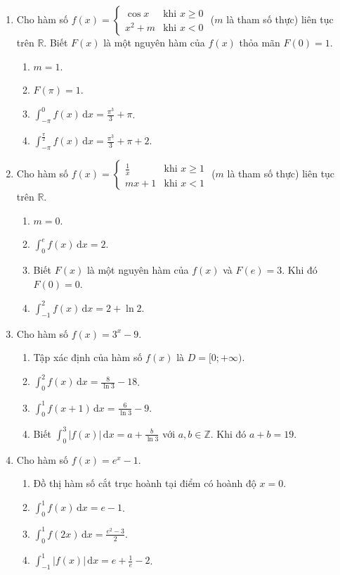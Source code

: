 \documentclass[12pt]{article}
\begin{document}
\begin{enumerate}[label=\textbf{Câu \arabic*.}]
		\item Cho hàm số $f(x) = \begin{cases} \cos x & \text{khi } x \ge 0 \\ x^2 + m & \text{khi } x < 0 \end{cases}$ ($m$ là tham số thực) liên tục trên $\mathbb{R}$. Biết $F(x)$ là một nguyên hàm của $f(x)$ thỏa mãn $F(0) = 1$.
		\begin{enumerate}[label=\alph*)]
			\item $m = 1$.
			\item $F(\pi) = 1$.
			\item $\displaystyle \int_{-\pi}^0 f(x)\,\mathrm{d}x = \frac{\pi^3}{3} + \pi$.
			\item $\displaystyle \int_{-\pi}^{\frac{\pi}{2}} f(x)\,\mathrm{d}x = \frac{\pi^3}{3} + \pi + 2$.
		\end{enumerate}
		
		\item Cho hàm số $f(x) = \begin{cases} \frac{1}{x} & \text{khi } x \ge 1 \\ mx + 1 & \text{khi } x < 1 \end{cases}$ ($m$ là tham số thực) liên tục trên $\mathbb{R}$.
		\begin{enumerate}[label=\alph*)]
			\item $m = 0$.
			\item $\displaystyle \int_0^e f(x)\,\mathrm{d}x = 2$.
			\item Biết $F(x)$ là một nguyên hàm của $f(x)$ và $F(e) = 3$. Khi đó $F(0) = 0$.
			\item $\displaystyle \int_{-1}^2 f(x)\,\mathrm{d}x = 2 + \ln 2$.
		\end{enumerate}
		
		\item Cho hàm số $f(x) = 3^x - 9$.
		\begin{enumerate}[label=\alph*)]
			\item Tập xác định của hàm số $f(x)$ là $D = [0; +\infty)$.
			\item $\displaystyle \int_0^2 f(x)\,\mathrm{d}x = \frac{8}{\ln 3} - 18$.
			\item $\displaystyle \int_0^1 f(x+1)\,\mathrm{d}x = \frac{6}{\ln 3} - 9$.
			\item Biết $\displaystyle \int_0^3 |f(x)|\,\mathrm{d}x = a + \frac{b}{\ln 3}$ với $a, b \in \mathbb{Z}$. Khi đó $a + b = 19$.
		\end{enumerate}
		
		\item Cho hàm số $f(x) = e^x - 1$.
		\begin{enumerate}[label=\alph*)]
			\item Đồ thị hàm số cắt trục hoành tại điểm có hoành độ $x=0$.
			\item $\displaystyle \int_0^1 f(x)\,\mathrm{d}x = e - 1$.
			\item $\displaystyle \int_0^1 f(2x)\,\mathrm{d}x = \frac{e^2 - 3}{2}$.
			\item $\displaystyle \int_{-1}^1 |f(x)|\,\mathrm{d}x = e + \frac{1}{e} - 2$.
		\end{enumerate}
		

\end{enumerate}
\end{document}
